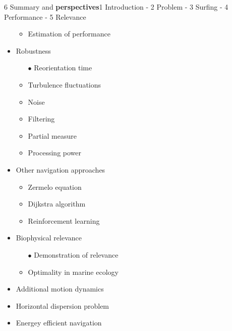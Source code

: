 \begin{frame}{6 Summary and \textbf{perspectives}}{1 Introduction - 2 Problem - 3 Surfing - 4 Performance - 5 Relevance}
\begin{multicols}{2}
\begin{itemize}
\begin{itemize}
					\item<2->[$\bullet$] Estimation of performance
				\end{itemize}
			\item \textcolor{ColorSurf}{Robustness}
				\begin{itemize}
					\scriptsize
					\item[$\bullet$] \textcolor{ColorSurf}{Reorientation time}
					\item<2->[$\bullet$] Turbulence fluctuations
					\item<2->[$\bullet$] Noise
					\item<2->[$\bullet$] Filtering
					\item<2->[$\bullet$] Partial measure
					\item<2->[$\bullet$] Processing power
				\end{itemize}
			\item<2-> Other navigation approaches
				\begin{itemize}
					\scriptsize
					\item<2->[$\bullet$] Zermelo equation
					\item<2->[$\bullet$] Dijkstra algorithm
					\item<2->[$\bullet$] Reinforcement learning
				\end{itemize}
			\item \textcolor{ColorSurf}{Biophysical relevance}
				\begin{itemize}
					\scriptsize
					\item[$\bullet$] \textcolor{ColorSurf}{Demonstration of relevance}
					\item<2->[$\bullet$] Optimality in marine ecology
				\end{itemize}
			\item<2-> Additional motion dynamics
			\item<2-> Horizontal dispersion problem
			\item<2-> Energey efficient navigation
		\end{itemize}
	\end{multicols}
\end{frame}

